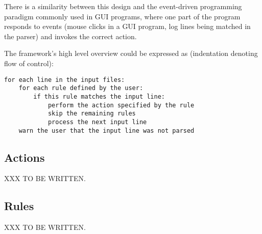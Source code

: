 There is a similarity between this design and the event-driven programming
paradigm commonly used in GUI programs, where one part of the program
responds to events (mouse clicks in a GUI program, log lines being matched
in the parser) and invokes the correct action.

The framework's high level overview could be expressed as (indentation
denoting flow of control):

\begin{verbatim}
for each line in the input files:
    for each rule defined by the user:
        if this rule matches the input line:
            perform the action specified by the rule
            skip the remaining rules
            process the next input line
    warn the user that the input line was not parsed
\end{verbatim}


\subsection{Actions}

XXX TO BE WRITTEN\@.

\subsection{Rules}

XXX TO BE WRITTEN\@.


